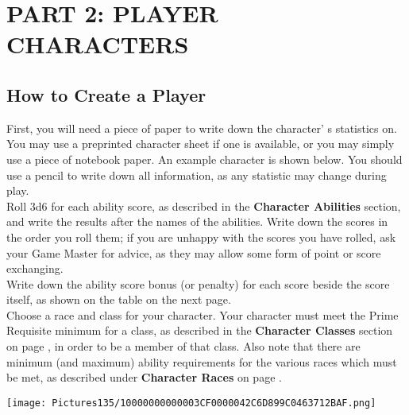 \documentclass[a4paper,twoside,openany,10pt]{book}
\begin{document}
\pagebreak

\section{PART 2: PLAYER CHARACTERS}\label{part-2-player-characters}

\begin{multicols}{2}

\subsection{How to Create a Player}

\label{how-to-create-a-player-character}

First, you will need a piece of paper to write down the character' s statistics on. You may use a preprinted character sheet if one is available, or you may simply use a piece of notebook paper. An example character is shown below. You should use a pencil to write down all information, as any statistic may change during play.\\

Roll 3d6 for each ability score, as described in the \textbf{Character Abilities} section, and write the results after the names of the abilities. Write down the scores in the order you roll them; if you are unhappy with the scores you have rolled, ask your Game Master for advice, as they may allow some form of point or score exchanging.\\

Write down the ability score bonus (or penalty) for each score beside the score itself, as shown on the table on the next page.\\

Choose a race and class for your character. Your character must meet the Prime Requisite minimum for a class, as described in the \textbf{Character Classes} section on page \hyperlink{character-classes}{\pageref{character-classes}}, in order to be a member of that class. Also note that there are minimum (and maximum) ability requirements for the various races which must be met, as described under \textbf{Character Races} on page \hyperlink{character-races}{\pageref{character-races}}.\\

\begin{flushleft}
	\texttt{[image: Pictures135/10000000000003CF0000042C6D899C0463712BAF.png]}
\end{flushleft}\medskip


\end{multicols}
\end{document}
